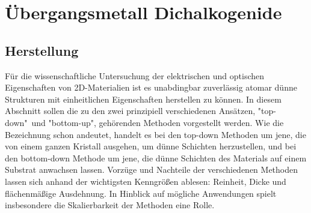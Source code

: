 \section{Übergangsmetall Dichalkogenide}
\subsection*{Herstellung}
Für die wissenschaftliche Untersuchung der elektrischen und optischen Eigenschaften von 2D-Materialien ist es unabdingbar zuverlässig atomar dünne Strukturen mit einheitlichen Eigenschaften herstellen zu können. In diesem Abschnitt sollen die zu den zwei prinzipiell verschiedenen Ansätzen,  "top-down"\ und "bottom-up", gehörenden Methoden vorgestellt werden. Wie die Bezeichnung schon andeutet, handelt es bei den top-down Methoden um jene, die von einem ganzen Kristall ausgehen, um dünne Schichten herzustellen, und bei den bottom-down Methode um jene, die dünne Schichten des Materials auf einem Substrat anwachsen lassen. Vorzüge und Nachteile der verschiedenen Methoden lassen sich anhand der wichtigsten Kenngrößen ablesen: Reinheit, Dicke und flächenmäßige Ausdehnung. In Hinblick auf mögliche Anwendungen spielt insbesondere die Skalierbarkeit der Methoden eine Rolle. 

